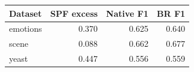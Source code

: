 \begin{tabular}{lrrr}
\toprule
Dataset & SPF excess & Native F1 & BR F1 \\
\midrule
emotions & 0.370 & 0.625 & 0.640 \\
scene & 0.088 & 0.662 & 0.677 \\
yeast & 0.447 & 0.556 & 0.559 \\
\bottomrule
\end{tabular}
